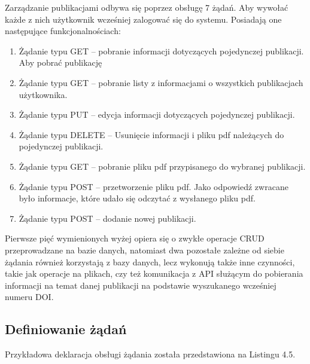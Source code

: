 \documentclass[a4paper,12pt,twoside,openany]{report}
\begin{document}
Zarządzanie publikacjami odbywa się poprzez obsługę 7 żądań. Aby wywołać każde z nich użytkownik wcześniej zalogować się do systemu. Posiadają one następujące funkcjonalnościach:
\begin{enumerate}
	
	\item Żądanie typu GET -- pobranie informacji dotyczących pojedynczej publikacji. Aby pobrać publikację 
	
	\item Żądanie typu GET -- pobranie listy z informacjami o wszystkich publikacjach użytkownika. 
		
	\item Żądanie typu PUT -- edycja informacji dotyczących pojedynczej publikacji.
	
	\item Żądanie typu DELETE -- Usunięcie informacji i pliku pdf należących do pojedynczej publikacji.
	
	\item Żądanie typu GET -- pobranie pliku pdf przypisanego do wybranej publikacji.
	
	\item Żądanie typu POST -- przetworzenie pliku pdf. Jako odpowiedź zwracane było informacje, które udało się odczytać z wysłanego pliku pdf.
	
	\item Żądanie typu POST -- dodanie nowej publikacji.
\end{enumerate}
\pagebreak
Pierwsze pięć wymienionych wyżej opiera się o zwykłe operacje CRUD przeprowadzane na bazie danych, natomiast dwa pozostałe zależne od siebie żądania również korzystają z bazy danych, lecz wykonują także inne czynności, takie jak operacje na plikach, czy też komunikacja z API służącym do pobierania informacji na temat danej publikacji na podstawie wyszukanego wcześniej numeru DOI.


\subsection{Definiowanie żądań}

Przykładowa deklaracja obsługi żądania została przedstawiona na Listingu 4.5.
\end{document}

